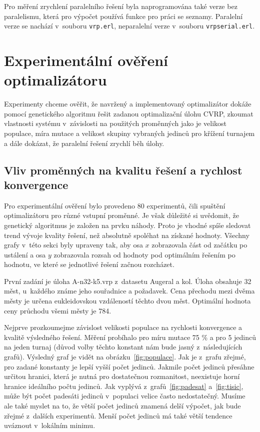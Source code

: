 \documentclass[a4paper]{article}
\begin{document}
Pro měření zrychlení paralelního řešení byla naprogramována také verze bez paralelismu, která pro výpočet používá funkce pro práci se seznamy. Paralelní verze se nachází v~souboru {\tt vrp.erl}, neparalelní verze v~sou\-bo\-ru {\tt vrpserial.erl}.

\section{Experimentální ověření optimalizátoru}

Experimenty chceme ověřit, že navržený a implementovaný optimalizátor do\-ká\-že pomocí genetického algoritmu řešit zadanou optimalizační úlohu CVRP, zkoumat vlastnosti systému v~závislosti na použitých proměnných jako je velikost populace, míra mutace a velikost skupiny vybraných jedinců pro křížení turnajem a dále dokázat, že paralelní řešení zrychlí běh úlohy.

\subsection{Vliv proměnných na kvalitu řešení a rychlost konvergence}

Pro experimentální ověření bylo provedeno 80 experimentů, čili spuštění optimalizátoru pro různé vstupní proměnné. Je však důležité si uvědomit, že genetický algoritmus je založen na prvku náhody. Proto je vhodné spíše sledovat trend vývoje kvality řešení, než absolutně spoléhat na získané hodnoty. Všechny grafy v~této sekci byly upraveny tak, aby osa $x$ zobrazovala část od začátku po ustálení a osa $y$ zobrazovala rozsah od hodnoty pod optimálním řešením po hodnotu, ve které se jednotlivé řešení začnou rozcházet.

První zadání je úloha A-n32-k5.vrp z~datasetu Augeral a kol. Úloha obsahuje 32 měst, u~každého známe jeho souřadnice a požadavek. Cena přechodu mezi dvěma městy je určena eukleidovskou vzdáleností těchto dvou měst. Optimální hodnota ceny průchodu všemi městy je 784.

Nejprve prozkoumejme závislost velikosti populace na rychlosti konvergence a kvalitě výsledného řešení. Měření probíhalo pro míru mutace 75 \% a pro 5 jedinců na jeden turnaj (důvod volby těchto konstant nám bude jasný z~ná\-sle\-du\-jí\-cích grafů). Výsledný graf je vidět na obrázku~\ref{fig:populace}. Jak je z~grafu zřejmé, pro zadané konstanty je lepší vyšší počet jedinců. Jakmile počet jedinců přesáhne určitou hranici, která je nutná pro dostatečnou rozmanitost, neexistuje horní hranice ideálního počtu jedinců. Jak vyplývá z~grafů~\ref{fig:padesat} a~\ref{fig:tisic}, může být počet padesáti jedinců v~populaci velice často nedostatečný. Musíme ale také myslet na to, že větší počet jedinců znamená delší výpočet, jak bude zřejmé z~dalších experimentů. Menší počet jedinců má také větší tendence uváznout v~lokálním minimu.
\end{document}
